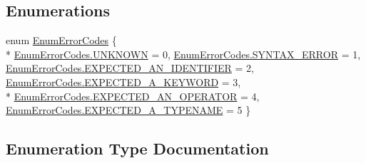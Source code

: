 \subsection*{Enumerations}
\begin{DoxyCompactItemize}
\item 
enum \hyperlink{namespace_c_p_u___o_s___simulator_1_1_compiler_1_1_frontend_a268b68f35fd94ce3549dd33a7e77d7e8}{Enum\+Error\+Codes} \{ \\*
\hyperlink{namespace_c_p_u___o_s___simulator_1_1_compiler_1_1_frontend_a268b68f35fd94ce3549dd33a7e77d7e8a696b031073e74bf2cb98e5ef201d4aa3}{Enum\+Error\+Codes.\+U\+N\+K\+N\+O\+W\+N} = 0, 
\hyperlink{namespace_c_p_u___o_s___simulator_1_1_compiler_1_1_frontend_a268b68f35fd94ce3549dd33a7e77d7e8a756ec3dd26d1a73363eb3e68b6e820df}{Enum\+Error\+Codes.\+S\+Y\+N\+T\+A\+X\+\_\+\+E\+R\+R\+O\+R} = 1, 
\hyperlink{namespace_c_p_u___o_s___simulator_1_1_compiler_1_1_frontend_a268b68f35fd94ce3549dd33a7e77d7e8aaa07d36fd7f47f0418447b6bfca4439a}{Enum\+Error\+Codes.\+E\+X\+P\+E\+C\+T\+E\+D\+\_\+\+A\+N\+\_\+\+I\+D\+E\+N\+T\+I\+F\+I\+E\+R} = 2, 
\hyperlink{namespace_c_p_u___o_s___simulator_1_1_compiler_1_1_frontend_a268b68f35fd94ce3549dd33a7e77d7e8acb3bfc44b4be4778a01045556f0a56b7}{Enum\+Error\+Codes.\+E\+X\+P\+E\+C\+T\+E\+D\+\_\+\+A\+\_\+\+K\+E\+Y\+W\+O\+R\+D} = 3, 
\\*
\hyperlink{namespace_c_p_u___o_s___simulator_1_1_compiler_1_1_frontend_a268b68f35fd94ce3549dd33a7e77d7e8af7359c8ef850f987f8f8198411bfedbb}{Enum\+Error\+Codes.\+E\+X\+P\+E\+C\+T\+E\+D\+\_\+\+A\+N\+\_\+\+O\+P\+E\+R\+A\+T\+O\+R} = 4, 
\hyperlink{namespace_c_p_u___o_s___simulator_1_1_compiler_1_1_frontend_a268b68f35fd94ce3549dd33a7e77d7e8a6d94d7d4db3edea858fce83c2f41aa9f}{Enum\+Error\+Codes.\+E\+X\+P\+E\+C\+T\+E\+D\+\_\+\+A\+\_\+\+T\+Y\+P\+E\+N\+A\+M\+E} = 5
 \}
\end{DoxyCompactItemize}


\subsection{Enumeration Type Documentation}
\hypertarget{namespace_c_p_u___o_s___simulator_1_1_compiler_1_1_frontend_a268b68f35fd94ce3549dd33a7e77d7e8}{}
